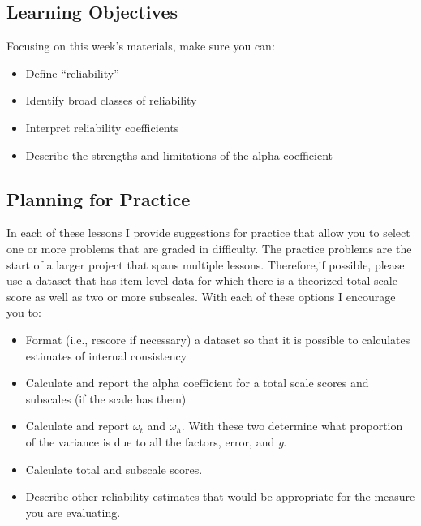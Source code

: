 \documentclass[
  english,
]{book}
\providecommand{\tightlist}{%
  \setlength{\itemsep}{0pt}\setlength{\parskip}{0pt}}
\begin{document}
\hypertarget{learning-objectives-3}{%
\subsection{Learning Objectives}\label{learning-objectives-3}}

Focusing on this week's materials, make sure you can:

\begin{itemize}
\tightlist
\item
  Define ``reliability''
\item
  Identify broad classes of reliability
\item
  Interpret reliability coefficients
\item
  Describe the strengths and limitations of the alpha coefficient
\end{itemize}

\hypertarget{planning-for-practice-3}{%
\subsection{Planning for Practice}\label{planning-for-practice-3}}

In each of these lessons I provide suggestions for practice that allow you to select one or more problems that are graded in difficulty. The practice problems are the start of a larger project that spans multiple lessons. Therefore,if possible, please use a dataset that has item-level data for which there is a theorized total scale score as well as two or more subscales. With each of these options I encourage you to:

\begin{itemize}
\tightlist
\item
  Format (i.e., rescore if necessary) a dataset so that it is possible to calculates estimates of internal consistency
\item
  Calculate and report the alpha coefficient for a total scale scores and subscales (if the scale has them)
\item
  Calculate and report \(\omega_{t}\) and \(\omega_{h}\). With these two determine what proportion of the variance is due to all the factors, error, and \emph{g}.
\item
  Calculate total and subscale scores.
\item
  Describe other reliability estimates that would be appropriate for the measure you are evaluating.
\end{itemize}
\end{document}
